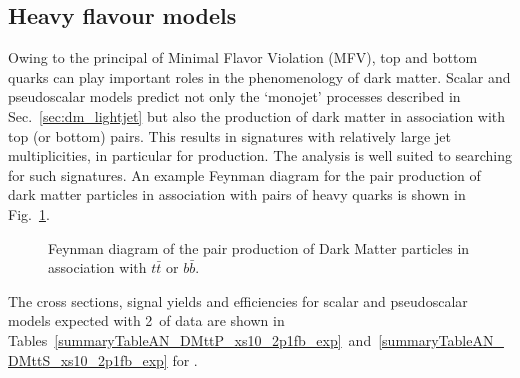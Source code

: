 



\clearpage
\subsection{Heavy flavour models} \label{sec:dm_heavyjet}

Owing to the principal of Minimal Flavor Violation (MFV), top and bottom quarks
can play important roles in the phenomenology of dark matter. Scalar and
pseudoscalar models predict not only the `monojet' processes described in
Sec.~\ref{sec:dm_lightjet} but also the production of dark matter in association
with top (or bottom) pairs. This results in signatures with relatively large jet
multiplicities, in particular for \DMtt production. The \alphat analysis is well 
suited to searching for such signatures. An example Feynman diagram for the pair
production of dark matter particles in association with pairs of heavy quarks is
shown in Fig.~\ref{fig:feynman_hf}.


\begin{figure}[h!] \centering
{}
\caption{Feynman diagram of the pair production of Dark Matter particles in
association with $t\bar{t}$ or $b\bar{b}$. \cite{Abercrombie:2015wmb}}
\label{fig:feynman_hf} \end{figure}


The cross sections, signal yields and efficiencies for scalar and pseudoscalar
\DMtt models expected with 2~\ifb of data are shown in 
Tables~\ref{summaryTableAN_DMttP_xs10_2p1fb_exp}~and~\ref{summaryTableAN_DMttS_xs10_2p1fb_exp} for \DMtt. 


